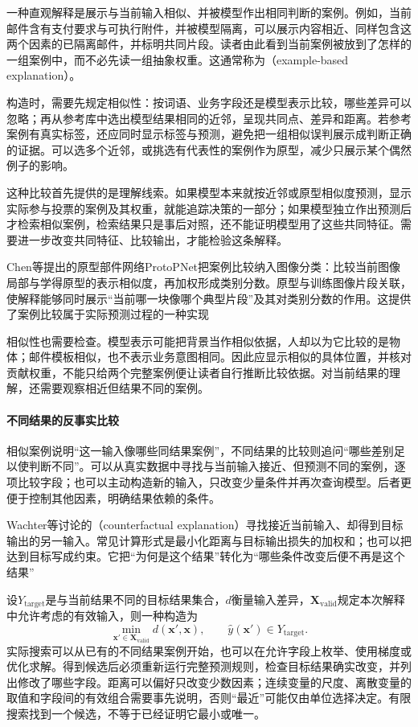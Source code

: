 一种直观解释是展示与当前输入相似、并被模型作出相同判断的案例。例如，当前邮件含有支付要求与可执行附件，并被模型隔离，可以展示内容相近、同样包含这两个因素的已隔离邮件，并标明共同片段。读者由此看到当前案例被放到了怎样的一组案例中，而不必先读一组抽象权重。这通常称为（example-based explanation）。

构造时，需要先规定相似性：按词语、业务字段还是模型表示比较，哪些差异可以忽略；再从参考库中选出模型结果相同的近邻，呈现共同点、差异和距离。若参考案例有真实标签，还应同时显示标签与预测，避免把一组相似误判展示成判断正确的证据。可以选多个近邻，或挑选有代表性的案例作为原型，减少只展示某个偶然例子的影响。

这种比较首先提供的是理解线索。如果模型本来就按近邻或原型相似度预测，显示实际参与投票的案例及其权重，就能追踪决策的一部分；如果模型独立作出预测后才检索相似案例，检索结果只是事后对照，还不能证明模型用了这些共同特征。需要进一步改变共同特征、比较输出，才能检验这条解释。

Chen等提出的原型部件网络ProtoPNet把案例比较纳入图像分类：比较当前图像局部与学得原型的表示相似度，再加权形成类别分数。原型与训练图像片段关联，使解释能够同时展示“当前哪一块像哪个典型片段”及其对类别分数的作用。这提供了案例比较属于实际预测过程的一种实现

相似性也需要检查。模型表示可能把背景当作相似依据，人却以为它比较的是物体；邮件模板相似，也不表示业务意图相同。因此应显示相似的具体位置，并核对贡献权重，不能只给两个完整案例便让读者自行推断比较依据。对当前结果的理解，还需要观察相近但结果不同的案例。

\paragraph{不同结果的反事实比较}

相似案例说明“这一输入像哪些同结果案例”，不同结果的比较则追问“哪些差别足以使判断不同”。可以从真实数据中寻找与当前输入接近、但预测不同的案例，逐项比较字段；也可以主动构造新的输入，只改变少量条件并再次查询模型。后者更便于控制其他因素，明确结果依赖的条件。

Wachter等讨论的（counterfactual explanation）寻找接近当前输入、却得到目标输出的另一输入。常见计算形式是最小化距离与目标输出损失的加权和；也可以把达到目标写成约束。它把“为何是这个结果”转化为“哪些条件改变后便不再是这个结果”

设$Y_{\mathrm{target}}$是与当前结果不同的目标结果集合，$d$衡量输入差异，$\bm X_{\mathrm{valid}}$规定本次解释中允许考虑的有效输入，则一种构造为
\begin{equation}
 \min_{\bm{x}'\in\bm X_{\mathrm{valid}}}
 d(\bm{x}',\bm{x}),
 \qquad \hat y(\bm{x}')\in Y_{\mathrm{target}}.
 \label{eq:interpretability-counterfactual}
\end{equation}
实际搜索可以从已有的不同结果案例开始，也可以在允许字段上枚举、使用梯度或优化求解。得到候选后必须重新运行完整预测规则，检查目标结果确实改变，并列出修改了哪些字段。距离可以偏好只改变少数因素；连续变量的尺度、离散变量的取值和字段间的有效组合需要事先说明，否则“最近”可能仅由单位选择决定。有限搜索找到一个候选，不等于已经证明它最小或唯一。

